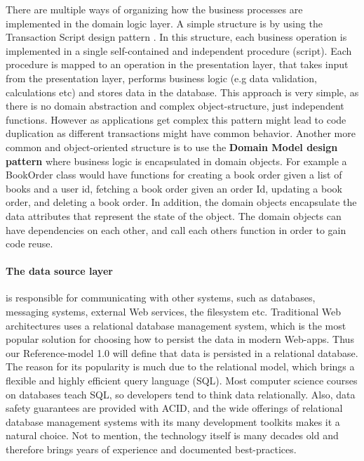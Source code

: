 There are multiple ways of organizing how the business processes are implemented in the domain logic layer. A simple structure is by using the Transaction Script design pattern \cite{poea}. In this structure, each business operation is implemented in a single self-contained and independent procedure (script). Each procedure is mapped to an operation in the presentation layer, that takes input from the presentation layer, performs business logic (e.g data validation, calculations etc) and stores data in the database. This approach is very simple, as there is no domain abstraction and complex object-structure, just independent functions. However as applications get complex this pattern might lead to code duplication as different transactions might have common behavior. Another more common and object-oriented structure is to use the \textbf{Domain Model design pattern} \cite{poea} where business logic is encapsulated in domain objects. For example a BookOrder class would have functions for creating a book order given a list of books and a user id, fetching a book order given an order Id, updating a book order, and deleting a book order. In addition, the domain objects encapsulate the data attributes that represent the state of the object. The domain objects can have dependencies on each other, and call each others function in order to gain code reuse.
	
\paragraph{The data source layer} is responsible for communicating with other systems, such as databases, messaging systems, external Web services, the filesystem etc. Traditional Web architectures uses a relational database management system, which is the most popular solution for choosing how to persist the data in modern Web-apps\cite{dbpop}. Thus our Reference-model 1.0 will define that data is persisted in a relational database. The reason for its popularity is much due to the relational model, which brings a flexible and highly efficient query language (SQL). Most computer science courses on databases teach SQL, so developers tend to think data relationally. Also, data safety guarantees are provided with ACID, and the wide offerings of relational database management systems with its many development toolkits makes it a natural choice. Not to mention, the technology itself is many decades old and therefore brings years of experience and documented best-practices. 

